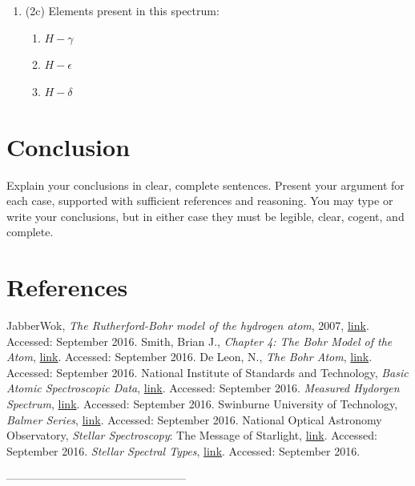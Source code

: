 \documentclass[12pt]{article}
\begin{document}
\begin{enumerate}
        \item (2c) Elements present in this spectrum:
            \begin{enumerate}
                \item $H-\gamma$
                \item $H-\epsilon$
                \item $H-\delta$
            \end{enumerate}
\end{enumerate}


\section{Conclusion}

Explain your conclusions in clear, complete sentences. Present your argument
for each case, supported with sufficient references and reasoning. You may type
or write your conclusions, but in either case they must be legible, clear, cogent,
and complete.


\section{References}
\begin{thebibliography}{8}
\bibitem{} JabberWok, \emph{The Rutherford-Bohr model of the hydrogen atom}, 2007, \href{https://commons.wikimedia.org/w/index.php?curid=2639910}{link}. Accessed: September 2016.
\bibitem{}Smith, Brian J., \emph{Chapter 4: The Bohr Model of the Atom}, \href{https://users.physics.ox.ac.uk/~smithb/website/coursenotes/qi/BohrModel.pdf}{link}. Accessed:
September 2016.
 De Leon, N., \emph{The Bohr Atom}, \href{http://www.iun.edu/~cpanhd/C101webnotes/modern-atomic-theory/Bohr-model.html}{link}. Accessed: September 2016.
\bibitem{} National Institute of Standards and Technology, \emph{Basic Atomic Spectroscopic Data}, \href{http://physics.nist.gov/PhysRefData/Handbook/atomic_number.htm}{link}. Accessed: September 2016.
\bibitem {} \emph{Measured Hydorgen Spectrum}, \href{http://hyperphysics.phy-astr.gsu.edu/hbase/tables/hydspec.html}{link}. Accessed: September 2016.
\bibitem{} Swinburne University of Technology, \emph{Balmer Series}, \href{http://astronomy.swin.edu.au/cosmos/B/Balmer+series}{link}. Accessed: September 2016.
\bibitem{} National Optical Astronomy Observatory, \emph{Stellar Spectroscopy}: The Message of Starlight, \href{https://www.noao.edu/education/astrobits/files/Stellar-Spectroscopy-Abits.pdf}{link}. Accessed: September 2016.
\bibitem{} \emph{Stellar Spectral Types}, \href{http://hyperphysics.phy-astr.gsu.edu/hbase/starlog/staspe.html}{link}. Accessed: September 2016.
\end{thebibliography}
————————————————
\end{document}
